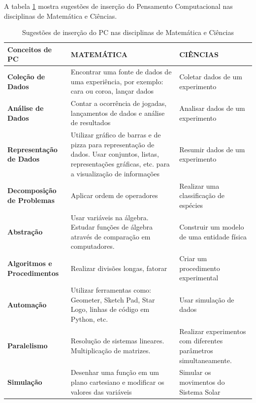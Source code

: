 \documentclass[12pt, openright, a4paper, brazil, english, french, spanish, bibjustif, openany, oneside]{abntex2}
\begin{document}
A tabela \ref{tab1} mostra sugestões de inserção do Pensamento Computacional nas disciplinas de Matemática e Ciências.

\newpage

\begin{table}[ht]
        \centering
        \caption{Sugestões de inserção do PC nas disciplinas de Matemática e Ciências \label{tab1}}
                
        \begin{tabular}{ >{\centering\arraybackslash}m{3cm} >{\centering\arraybackslash}m{5.5cm} >{\centering\arraybackslash}m{6cm}}
            \toprule
            \textbf{Conceitos de PC} & \textbf{MATEMÁTICA} & \textbf{CIÊNCIAS} \\
            \midrule
            \textbf{Coleção de Dados} & Encontrar uma fonte de dados de uma experiência, por exemplo: cara ou coroa, lançar dados & Coletar dados de um experimento \\
            \midrule
            \textbf{Análise de Dados} & Contar a ocorrência de jogadas, lançamentos de dados e análise de resultados & Analisar dados de um experimento  \\
            \midrule
            \textbf{Representação de Dados} & Utilizar gráfico de barras e de pizza para representação de dados. Usar conjuntos, listas, representações gráficas, etc. para a visualização de informações & Resumir dados de um experimento \\
            \midrule
            \textbf{Decomposição de Problemas} & Aplicar ordem de operadores & Realizar uma classificação de espécies \\
            \midrule
            \textbf{Abstração} & Usar variáveis na álgebra. Estudar funções de álgebra através de comparação em computadores. & Construir um modelo de uma entidade física \\
            \midrule
            \textbf{Algoritmos e Procedimentos} & Realizar divisões longas, fatorar & Criar um procedimento experimental \\
            \midrule
            \textbf{Automação} & Utilizar ferramentas como: Geometer, Sketch Pad, Star Logo, linhas de código em Python, etc. & Usar simulação de dados \\
            \midrule
            \textbf{Paralelismo} & Resolução de sistemas lineares. Multiplicação de matrizes. & Realizar experimentos com diferentes parâmetros simultaneamente. \\
            \midrule
            \textbf{Simulação} & Desenhar uma função em um plano cartesiano e modificar os valores das variáveis & Simular os movimentos do Sistema Solar \\
            \bottomrule
        \end{tabular}
    \end{table}
\end{document}
